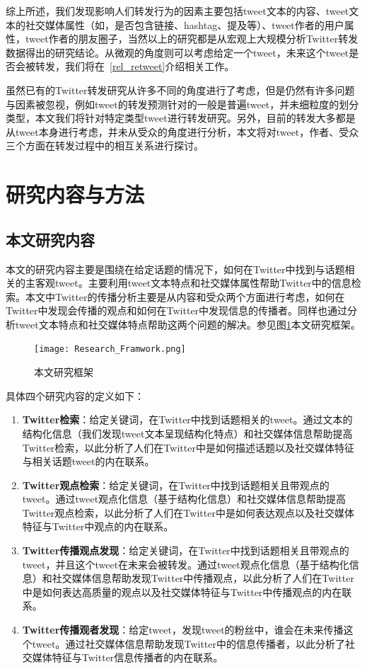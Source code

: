 综上所述，我们发现影响人们转发行为的因素主要包括tweet文本的内容、tweet文本的社交媒体属性（如，是否包含链接、hashtag、提及等）、tweet作者的用户属性，tweet作者的朋友圈子，当然以上的研究都是从宏观上大规模分析Twitter转发数据得出的研究结论。从微观的角度则可以考虑给定一个tweet，未来这个tweet是否会被转发，我们将在~\ref{rel_retweet}介绍相关工作。

虽然已有的Twitter转发研究从许多不同的角度进行了考虑，但是仍然有许多问题与因素被忽视，例如tweet的转发预测针对的一般是普遍tweet，并未细粒度的划分类型，本文我们将针对特定类型tweet进行转发研究。另外，目前的转发大多都是从tweet本身进行考虑，并未从受众的角度进行分析，本文将对tweet，作者、受众三个方面在转发过程中的相互关系进行探讨。



\section{研究内容与方法}

\subsection{本文研究内容}
本文的研究内容主要是围绕在给定话题的情况下，如何在Twitter中找到与话题相关的主客观tweet。主要利用tweet文本特点和社交媒体属性帮助Twitter中的信息检索。本文中Twitter的传播分析主要是从内容和受众两个方面进行考虑，如何在Twitter中发现会传播的观点和如何在Twitter中发现信息的传播者。同样也通过分析tweet文本特点和社交媒体特点帮助这两个问题的解决。参见图\ref{Research_Framwork}本文研究框架。

\begin{figure}[htp]
\centering
\texttt{[image: Research\_Framwork.png]}
\caption{本文研究框架}
\label{Research_Framwork}
\end{figure}

具体四个研究内容的定义如下：

\begin{enumerate}
\item \textbf{Twitter检索}：给定关键词，在Twitter中找到话题相关的tweet。通过文本的结构化信息（我们发现tweet文本呈现结构化特点）和社交媒体信息帮助提高Twitter检索，以此分析了人们在Twitter中是如何描述话题以及社交媒体特征与相关话题tweet的内在联系。
\item \textbf{Twitter观点检索}：给定关键词，在Twitter中找到话题相关且带观点的tweet。通过tweet观点化信息（基于结构化信息）和社交媒体信息帮助提高Twitter观点检索，以此分析了人们在Twitter中是如何表达观点以及社交媒体特征与Twitter中观点的内在联系。
\item \textbf{Twitter传播观点发现}：给定关键词，在Twitter中找到话题相关且带观点的tweet，并且这个tweet在未来会被转发。通过tweet观点化信息（基于结构化信息）和社交媒体信息帮助发现Twitter中传播观点，以此分析了人们在Twitter中是如何表达高质量的观点以及社交媒体特征与Twitter中传播观点的内在联系。
\item \textbf{Twitter传播观者发现}：给定tweet，发现tweet的粉丝中，谁会在未来传播这个tweet。通过社交媒体信息帮助发现Twitter中的信息传播者，以此分析了社交媒体特征与Twitter信息传播者的内在联系。
\end{enumerate}

